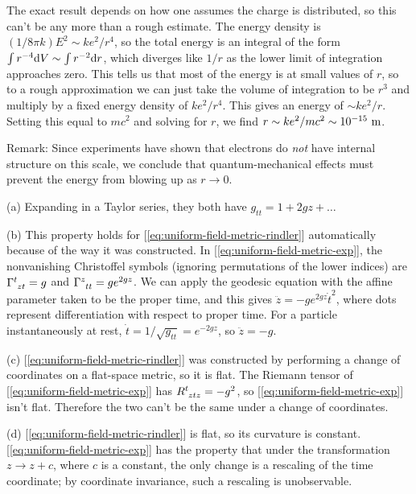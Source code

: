 
The exact result depends on how one assumes the charge is distributed, so this can't be any more than a rough
estimate. The energy density is $(1/8\pi k)E^2 \sim ke^2/r^4$, so the total energy is an integral of the form
$\int r^{-4} \textup{d} V \sim \int r^{-2} \textup{d} r$, which diverges like $1/r$ as the lower limit of integration approaches
zero. This tells us that most of the energy is at small values of $r$, so to a rough approximation we can just
take the volume of integration to be $r^3$ and multiply by a fixed energy density of $ke^2/r^4$. This gives
an energy of $\sim ke^2/r$. Setting this equal to $mc^2$ and solving for $r$, we find $r \sim ke^2/mc^2 \sim 10^{-15}\ \munit$.

Remark: Since experiments have shown that electrons do \emph{not} have internal structure on this scale, we conclude that
quantum-mechanical effects must prevent the energy from blowing up as $r\rightarrow 0$.



(a) Expanding in a Taylor series, they both have $g_{tt}=1+2gz+\ldots$

(b) This property holds for [\ref{eq:uniform-field-metric-rindler}] automatically because of the way it was constructed.
In [\ref{eq:uniform-field-metric-exp}], the nonvanishing Christoffel
symbols (ignoring permutations of the lower indices) are $\Gamma\indices{^t_{zt}}=g$ and $\Gamma\indices{^z_{tt}}=ge^{2gz}$.
We can apply the geodesic equation with the affine parameter taken to be the proper time, and this gives 
$\ddot{z}=-ge^{2gz}\dot{t}^2$, where dots represent differentiation with respect to proper time.
For a particle instantaneously at rest, $\dot{t}=1/\sqrt{g_{tt}}=e^{-2gz}$, so $\ddot{z}=-g$.

(c) [\ref{eq:uniform-field-metric-rindler}] was constructed by performing a change of coordinates on a flat-space metric, so it is flat. 
The Riemann tensor of [\ref{eq:uniform-field-metric-exp}] has $R\indices{^t_{ztz}}=-g^2$, so [\ref{eq:uniform-field-metric-exp}] isn't flat.
Therefore the two can't be the same under a change of coordinates.

(d) [\ref{eq:uniform-field-metric-rindler}] is flat, so its curvature is constant. [\ref{eq:uniform-field-metric-exp}] has the
property that under the transformation $z\rightarrow z+c$, where $c$ is a constant, the only change is a rescaling of the
time coordinate; by coordinate invariance, such a rescaling is unobservable.

